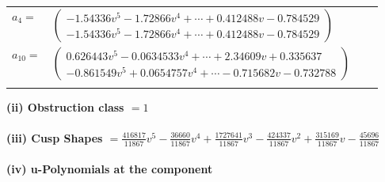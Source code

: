 \documentclass[1p]{elsarticle_modified}
\theoremstyle{definition}
\begin{document}
\begin{tabular}{m{7pt} m{180pt} m{7pt} m{180pt} }
\flushright $a_{4}=$&$\begin{pmatrix}-1.54336 v^{5}-1.72866 v^{4}+\cdots+0.412488 v-0.784529\\-1.54336 v^{5}-1.72866 v^{4}+\cdots+0.412488 v-0.784529\end{pmatrix}$ \\
\flushright $a_{10}=$&$\begin{pmatrix}0.626443 v^{5}-0.0634533 v^{4}+\cdots+2.34609 v+0.335637\\-0.861549 v^{5}+0.0654757 v^{4}+\cdots-0.715682 v-0.732788\end{pmatrix}$\\&\end{tabular}
\flushleft \textbf{(ii) Obstruction class $= 1$}\\~\\
\flushleft \textbf{(iii) Cusp Shapes $= \frac{416817}{11867} v^5-\frac{36660}{11867} v^4+\frac{1727641}{11867} v^3-\frac{424337}{11867} v^2+\frac{315169}{11867} v-\frac{45696}{11867}$}\\~\\
\newpage\renewcommand{\arraystretch}{1}
\flushleft \textbf{(iv) u-Polynomials at the component}\newline \\
\end{document}
